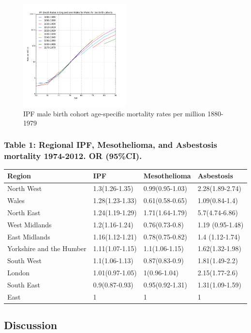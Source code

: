 \documentclass[
]{article}
\begin{document}
\begin{figure}
\centering
\includegraphics[width=0.5\textwidth,height=\textheight]{source/figures/ipfmalebirthcohorts.jpg}
\caption{IPF male birth cohort age-specific mortality rates per million
1880-1979 \label{birthcohorts}}
\end{figure}

\hypertarget{table-1-regional-ipf-mesothelioma-and-asbestosis-mortality-1974-2012.-or-95ci.}{%
\subsubsection{Table 1: Regional IPF, Mesothelioma, and Asbestosis
mortality 1974-2012. OR
(95\%CI).}\label{table-1-regional-ipf-mesothelioma-and-asbestosis-mortality-1974-2012.-or-95ci.}}

\begin{longtable}[]{@{}llll@{}}
\toprule
Region & IPF & Mesothelioma & Asbestosis\tabularnewline
\midrule
\endhead
North West & 1.3(1.26-1.35) & 0.99(0.95-1.03) &
2.28(1.89-2.74)\tabularnewline
Wales & 1.28(1.23-1.33) & 0.61(0.58-0.65) &
1.09(0.84-1.4)\tabularnewline
North East & 1.24(1.19-1.29) & 1.71(1.64-1.79) &
5.7(4.74-6.86)\tabularnewline
West Midlands & 1.2(1.16-1.24) & 0.76(0.73-0.8) & 1.19
(0.95-1.48)\tabularnewline
East Midlands & 1.16(1.12-1.21) & 0.78(0.75-0.82) & 1.4
(1.12-1.74)\tabularnewline
Yorkshire and the Humber & 1.11(1.07-1.15) & 1.1(1.06-1.15) &
1.62(1.32-1.98)\tabularnewline
South West & 1.1(1.06-1.13) & 0.87(0.83-0.9) &
1.81(1.49-2.2)\tabularnewline
London & 1.01(0.97-1.05) & 1(0.96-1.04) & 2.15(1.77-2.6)\tabularnewline
South East & 0.9(0.87-0.93) & 0.95(0.92-1.31) &
1.31(1.09-1.59)\tabularnewline
East & 1 & 1 & 1\tabularnewline
\bottomrule
\end{longtable}

\hypertarget{discussion-1}{%
\subsection{Discussion}\label{discussion-1}}
\end{document}
